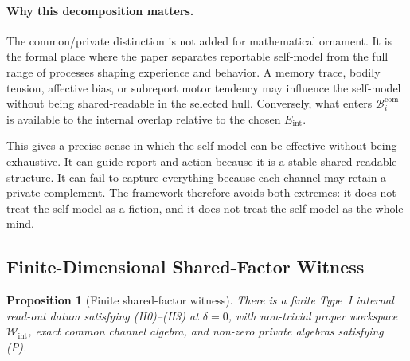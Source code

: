 \documentclass[12pt]{article}
\newtheorem{proposition}{Proposition}[section]
\theoremstyle{definition}
\theoremstyle{remark}
\newcommand{\Wint}{\mathcal W_{\mathrm{int}}}
\begin{document}
\paragraph{Why this decomposition matters.}
The common/private distinction is not added for mathematical ornament.
It is the formal place where the paper separates reportable self-model
from the full range of processes shaping experience and behavior. A
memory trace, bodily tension, affective bias, or subreport motor
tendency may influence the self-model without being shared-readable in
the selected hull. Conversely, what enters
\(\mathcal B_i^{\mathrm{com}}\) is available to the internal overlap
relative to the chosen \(E_{\mathrm{int}}\).

This gives a precise sense in which the self-model can be effective
without being exhaustive. It can guide report and action because it is a
stable shared-readable structure. It can fail to capture everything
because each channel may retain a private complement. The framework
therefore avoids both extremes: it does not treat the self-model as a
fiction, and it does not treat the self-model as the whole mind.

\subsection{Finite-Dimensional Shared-Factor Witness}

\begin{proposition}[Finite shared-factor witness]
\label{prop:fd-brain-witness}
There is a finite Type~I internal read-out datum satisfying (H0)--(H3)
at \(\delta=0\), with non-trivial proper workspace \(\Wint\), exact
common channel algebra, and non-zero private algebras satisfying (P).
\end{proposition}
\end{document}
